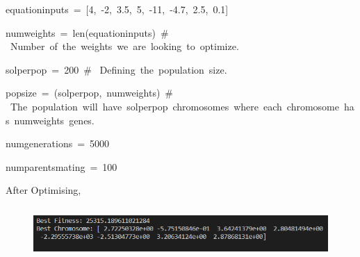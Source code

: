 \documentclass[12pt]{article}
\renewcommand{\_}{\kern-1.5pt\textunderscore\kern-1.5pt}
\begin{document}
{\fontsize{10pt}{12.0pt}\selectfont \textcolor[HTML]{D4D4D4}{equation\_inputs = [4, -2, 3.5, 5, -11, -4.7, 2.5, 0.1]}\par}\par


\vspace{\baselineskip}
{\fontsize{10pt}{12.0pt}\selectfont \textcolor[HTML]{D4D4D4}{num\_weights = len(equation\_inputs) $\#$  Number of the weights we are looking to optimize.}\par}\par


\vspace{\baselineskip}
{\fontsize{10pt}{12.0pt}\selectfont \textcolor[HTML]{D4D4D4}{sol\_per\_pop = 200 $\#$  Defining the population size.}\par}\par


\vspace{\baselineskip}
{\fontsize{10pt}{12.0pt}\selectfont \textcolor[HTML]{D4D4D4}{pop\_size = (sol\_per\_pop, num\_weights) $\#$  The population will have sol\_per\_pop chromosomes where each chromosome has num\_weights genes.}\par}\par


\vspace{\baselineskip}
{\fontsize{10pt}{12.0pt}\selectfont \textcolor[HTML]{D4D4D4}{num\_generations = 5000}\par}\par


\vspace{\baselineskip}
{\fontsize{10pt}{12.0pt}\selectfont \textcolor[HTML]{D4D4D4}{num\_parents\_mating = 100}\par}\par

{\fontsize{14pt}{16.8pt}\selectfont After Optimising,\par}\par




\begin{figure}[H]
	\begin{Center}
		\includegraphics[width=6.5in,height=0.79in]{./media/image19.png}
	\end{Center}
\end{figure}



\par


\vspace{\baselineskip}

\vspace{\baselineskip}

\printbibliography
\end{document}
